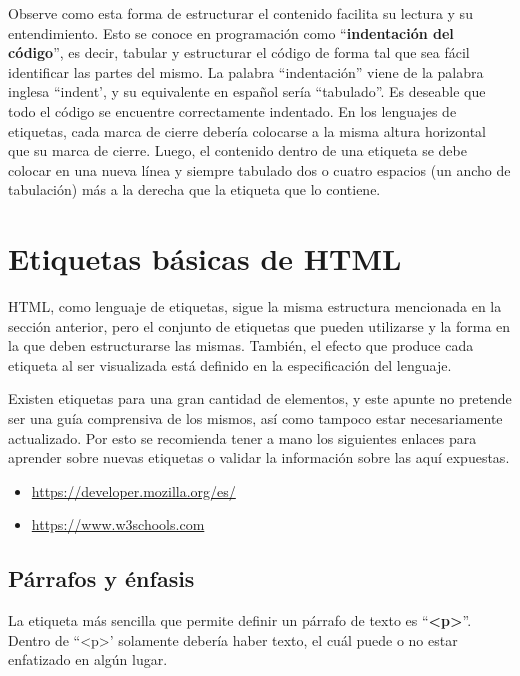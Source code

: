 Observe como esta forma de estructurar el contenido facilita su lectura y
su entendimiento. Esto se conoce en programación como ``\textbf{indentación del
código}'', es decir, tabular y estructurar el código de forma tal que sea fácil
identificar las partes del mismo. La palabra ``indentación'' viene de la palabra
inglesa ``indent', y su equivalente en español sería ``tabulado''. Es deseable
que todo el código se encuentre correctamente indentado. En los lenguajes de
etiquetas, cada marca de cierre debería colocarse a la misma altura horizontal
que su marca de cierre. Luego, el contenido dentro de una etiqueta se debe colocar
en una nueva línea y siempre tabulado dos o cuatro espacios (un ancho de tabulación)
más a la derecha que la etiqueta que lo contiene.

\section{Etiquetas básicas de HTML}

HTML, como lenguaje de etiquetas, sigue la misma estructura mencionada en la
sección anterior, pero el conjunto de etiquetas que pueden utilizarse y la
forma en la que deben estructurarse las mismas. También, el efecto que produce
cada etiqueta al ser visualizada está definido en la especificación del lenguaje.

Existen etiquetas para una gran cantidad de elementos, y este apunte no pretende
ser una guía comprensiva de los mismos, así como tampoco estar necesariamente
actualizado. Por esto se recomienda tener a mano los siguientes enlaces para
aprender sobre nuevas etiquetas o validar la información sobre las aquí expuestas.

\begin{itemize}
    \item \href{https://developer.mozilla.org/es/}{https://developer.mozilla.org/es/}
    \item \href{https://www.w3schools.com}{https://www.w3schools.com}
\end{itemize}


\subsection*{Párrafos y énfasis}

La etiqueta más sencilla que permite definir un párrafo de texto es
``\textbf{<p>}''. Dentro de ``<p>' solamente debería haber texto, el cuál puede
o no estar enfatizado en algún lugar.

